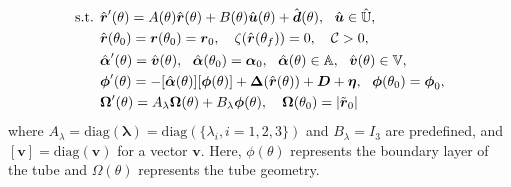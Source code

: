 \begin{subequations}
\begin{align}
    \textrm{s.t. } & \hat{\boldsymbol{r}}'(\theta)=A(\theta)\hat{\boldsymbol{r}}(\theta)+B(\theta)\hat{\boldsymbol{u}}(\theta)+\hat{\boldsymbol{d}}(\theta), \ \ \hat{\boldsymbol{u}}\in\hat{\mathbb{U}},\\
    & \hat{\boldsymbol{r}}(\theta_0)=\boldsymbol{r}(\theta_0)=\boldsymbol{r}_0, \quad\zeta(\hat{\boldsymbol{r}}(\theta_f))=0,\quad{\mathcal{C}}>0,\\
    & \hat{\boldsymbol{\alpha}}'(\theta)=\hat{\boldsymbol{v}}(\theta), \ \ \hat{\boldsymbol{\alpha}}(\theta_0)=\boldsymbol{\alpha}_0, \ \ \hat{\boldsymbol{\alpha}}(\theta)\in{\mathbb{A}}, \ \ \hat{\boldsymbol{v}}(\theta)\in{\mathbb{V}},\\
    & \boldsymbol{\phi}'(\theta)=-[\hat{\boldsymbol{\alpha}}(\theta)][\boldsymbol{\phi}(\theta)]+\boldsymbol{\Delta}(\hat{\boldsymbol{r}}(\theta))+\boldsymbol{D}+\boldsymbol{\eta},\ \ \boldsymbol{\phi}(\theta_0)=\boldsymbol{\phi}_0,\\
    & \boldsymbol{\Omega}'(\theta)=A_\lambda\boldsymbol{\Omega}(\theta)+B_\lambda\boldsymbol{\phi}(\theta),\quad\boldsymbol{\Omega}(\theta_0)=|\Tilde{\boldsymbol{r}}_0|
    \label{eqn:docking-problem}
\end{align}
\end{subequations}
where $A_\lambda=\text{diag}(\boldsymbol{\lambda})=\text{diag}(\{\lambda_i,i=1,2,3\})$ and $B_\lambda=I_{3}$ are predefined, and $[\boldsymbol{v}]=\text{diag}(\boldsymbol{v})$ for a vector $\boldsymbol{v}$.
Here, $\phi(\theta)$ represents the boundary layer of the tube and $\Omega(\theta)$ represents the tube geometry.
